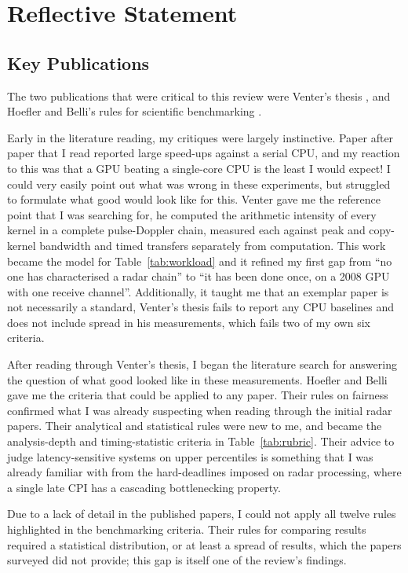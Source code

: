 \section{Reflective Statement}
\label{sec:reflection}
\subsection{Key Publications}
The two publications that were critical to this review were Venter's thesis \cite{venterSOFTWAREDEFINEDPULSEDOPPLERRADAR}, and Hoefler and Belli's rules for scientific benchmarking \cite{hoeflerScientificBenchmarkingParallel2015a}.

Early in the literature reading, my critiques were largely instinctive. Paper after paper
that I read reported large speed-ups against a serial CPU, and my reaction to this was that a GPU beating a single-core CPU is the least I would expect! I could very easily point out what was wrong in these experiments, but struggled to formulate what good would look like for this. Venter gave me the reference point that I was searching for, he computed the arithmetic intensity of every kernel in a complete pulse-Doppler chain, measured each against peak and copy-kernel bandwidth and timed transfers separately from computation. This work became the model for Table~\ref{tab:workload} and it refined my first gap from ``no one has characterised a radar chain'' to ``it has been done once, on a 2008 GPU with one receive channel''. Additionally, it taught me that an exemplar paper is not necessarily a standard, Venter's thesis fails to report any CPU baselines and does not include spread in his measurements, which fails two of my own six criteria.

After reading through Venter's thesis, I began the literature search for answering the question of what good looked like in these measurements. Hoefler and Belli gave me the criteria that could be applied to any paper. Their rules on fairness confirmed what I was already suspecting when reading through the initial radar papers. Their analytical and statistical rules were new to me, and became the analysis-depth and timing-statistic criteria in Table~\ref{tab:rubric}. Their advice to judge latency-sensitive systems on upper percentiles is something that I was already familiar with from the hard-deadlines imposed on radar processing, where a single late CPI has a cascading bottlenecking property.

Due to a lack of detail in the published papers, I could not apply all twelve rules highlighted in the benchmarking criteria. Their rules for comparing results required a statistical distribution, or at least a spread of results, which the papers surveyed did not provide; this gap is itself one of the review's findings.


